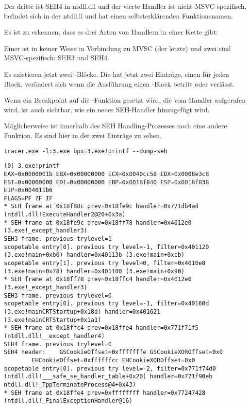 Der dritte ist SEH4 in ntdll.dll und der vierte Handler ist nicht MSVC-spezifisch,
befindet sich in der ntdll.ll und hat einen selbsterklärenden Funktionsnamen.

Es ist zu erkennen, dass es drei Arten von Handlern in einer Kette gibt:

Einer ist in keiner Weise in Verbindung zu MVSC (der letzte) und zwei sind MSVC-spezifisch:
SEH3 und SEH4.




Es existieren jetzt zwei -Blöcke.
Die  hat jetzt zwei Einträge, einen für jeden Block.
 verändert sich wenn die Ausführung einen -Block
betritt oder verlässt.



Wenn ein Breakpoint auf die \printf{}-Funktion gesetzt wird, die vom Handler
aufgerufen wird, ist auch sichtbar, wie ein neuer SEH-Handler hinzugefügt wird.

Möglicherweise ist innerhalb des SEH Handling-Prozesses noch eine andere Funktion.
Es sind hier in der  zwei Einträge zu sehen.

\begin{lstlisting}
tracer.exe -l:3.exe bpx=3.exe!printf --dump-seh
\end{lstlisting}

\begin{lstlisting}[caption=tracer.exe output]
(0) 3.exe!printf
EAX=0x0000001b EBX=0x00000000 ECX=0x0040cc58 EDX=0x0008e3c8
ESI=0x00000000 EDI=0x00000000 EBP=0x0018f840 ESP=0x0018f838
EIP=0x004011b6
FLAGS=PF ZF IF
* SEH frame at 0x18f88c prev=0x18fe9c handler=0x771db4ad (ntdll.dll!ExecuteHandler2@20+0x3a)
* SEH frame at 0x18fe9c prev=0x18ff78 handler=0x4012e0 (3.exe!_except_handler3)
SEH3 frame. previous trylevel=1
scopetable entry[0]. previous try level=-1, filter=0x401120 (3.exe!main+0xb0) handler=0x40113b (3.exe!main+0xcb)
scopetable entry[1]. previous try level=0, filter=0x4010e8 (3.exe!main+0x78) handler=0x401100 (3.exe!main+0x90)
* SEH frame at 0x18ff78 prev=0x18ffc4 handler=0x4012e0 (3.exe!_except_handler3)
SEH3 frame. previous trylevel=0
scopetable entry[0]. previous try level=-1, filter=0x40160d (3.exe!mainCRTStartup+0x18d) handler=0x401621 (3.exe!mainCRTStartup+0x1a1)
* SEH frame at 0x18ffc4 prev=0x18ffe4 handler=0x771f71f5 (ntdll.dll!__except_handler4)
SEH4 frame. previous trylevel=0
SEH4 header:	GSCookieOffset=0xfffffffe GSCookieXOROffset=0x0
		EHCookieOffset=0xffffffcc EHCookieXOROffset=0x0
scopetable entry[0]. previous try level=-2, filter=0x771f74d0 (ntdll.dll!___safe_se_handler_table+0x20) handler=0x771f90eb ntdll.dll!_TppTerminateProcess@4+0x43)
* SEH frame at 0x18ffe4 prev=0xffffffff handler=0x77247428 (ntdll.dll!_FinalExceptionHandler@16)
\end{lstlisting}

